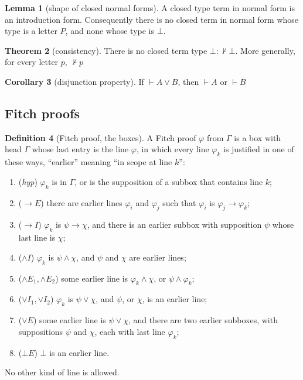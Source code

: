 \documentclass[a4paper, 11pt]{article}
\theoremstyle{definition}
\newtheorem{definition}{Definition}[section]
\newtheorem{theorem}[definition]{Theorem}
\newtheorem{lemma}[definition]{Lemma}
\newtheorem{corollary}[definition]{Corollary}
\begin{document}
\begin{lemma}[shape of closed normal forms]
    A closed type term in normal form is an introduction form. Consequently there is no closed term in normal form whose
    type is a letter $P$, and none whose type is $\bot$.
\end{lemma}

\begin{theorem}[consistency]
    There is no closed term type $\bot : \not \vdash \bot$. More generally, for every letter $p$, $\not \vdash p$
\end{theorem}

\begin{corollary}[disjunction property]
    If $\vdash A \lor B$, then $\vdash A$ or $\vdash B$
\end{corollary}

\newpage
\subsection{Fitch proofs}

\begin{definition}[Fitch proof, the boxes]
    A Fitch proof $\varphi$ from $\Gamma$ is a box with head $\Gamma$ whose last entry is the line $\varphi$, in which
    every line $\varphi_k$ is justified in one of these ways, ``earlier'' meaning ``in scope at line $k$'':
    \begin{enumerate}
        \item (\textit{hyp}) $\varphi_k$ is in $\Gamma$, or is the supposition of a subbox that contains line $k$;
        \item ($\to E$) there are earlier lines $\varphi_i$ and $\varphi_j$ such that $\varphi_i$ is $\varphi_j \to 
        \varphi_k$;
        \item ($\to I$) $\varphi_k$ is $\psi \to \chi$, and there is an earlier subbox with supposition $\psi$ whose 
        last line is $\chi$;
        \item ($\land I$) $\varphi_k$ is $\psi \land \chi$, and $\psi$ and $\chi$ are earlier lines;
        \item ($\land E_1, \land E_2$) some earlier line is $\varphi_k \land \chi$, or $\psi \land \varphi_k$;
        \item ($\lor I_1, \lor I_2$) $\varphi_k$ is $\psi \lor \chi$, and $\psi$, or $\chi$, is an earlier line; 
        \item ($\lor E$) some earlier line is $\psi \lor \chi$, and there are two earlier subboxes, with suppositions
        $\psi$ and $\chi$, each with last line $\varphi_k$;
        \item ($\bot E$) $\bot$ is an earlier line.
    \end{enumerate}
    No other kind of line is allowed.
\end{definition}
\end{document}
